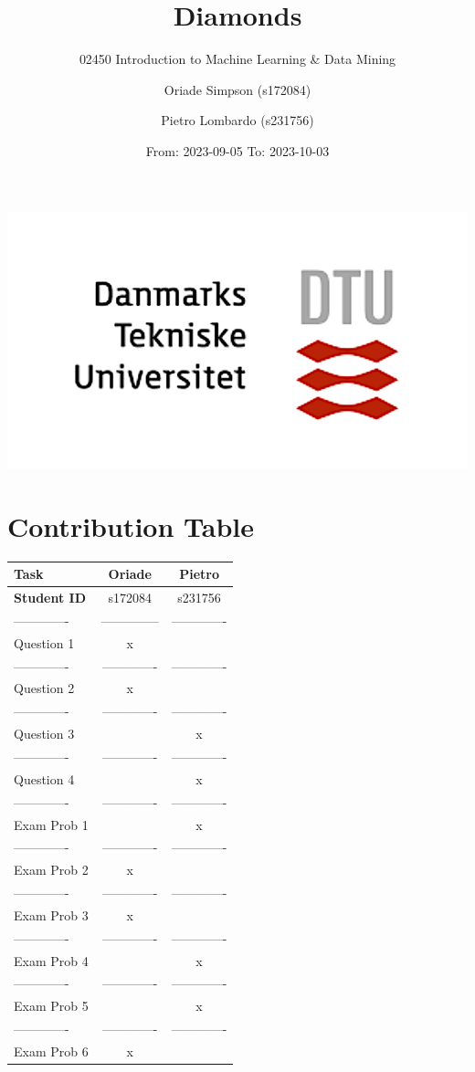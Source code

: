 \documentclass[
]{article}
\title{Diamonds}
\subtitle{02450 Introduction to Machine Learning \& Data Mining}
\author{Oriade Simpson (s172084) \and Pietro Lombardo (s231756)}
\date{From: 2023-09-05 To: 2023-10-03}
\begin{document}
\maketitle

\begin{center}\includegraphics[width=0.4\linewidth]{Images/Universe2} \end{center}

\center

\section{Contribution Table}\label{contribution-table}

\center

\begin{longtable}[]{@{}lcc@{}}
\toprule\noalign{}
Task & Oriade & Pietro \\
\midrule\noalign{}
\endhead
\bottomrule\noalign{}
\endlastfoot
\textbf{Student ID} & s172084 & s231756 \\
------------- & -------------- & ------------- \\
Question 1 & x & \\
------------- & ------------- & ------------- \\
Question 2 & x & \\
------------- & ------------- & ------------- \\
Question 3 & & x \\
------------- & ------------- & ------------- \\
Question 4 & & x \\
------------- & ------------- & ------------- \\
Exam Prob 1 & & x \\
------------- & ------------- & ------------- \\
Exam Prob 2 & x & \\
------------- & ------------- & ------------- \\
Exam Prob 3 & x & \\
------------- & ------------- & ------------- \\
Exam Prob 4 & & x \\
------------- & ------------- & ------------- \\
Exam Prob 5 & & x \\
------------- & ------------- & ------------- \\
Exam Prob 6 & x & \\
\end{longtable}
\end{document}
